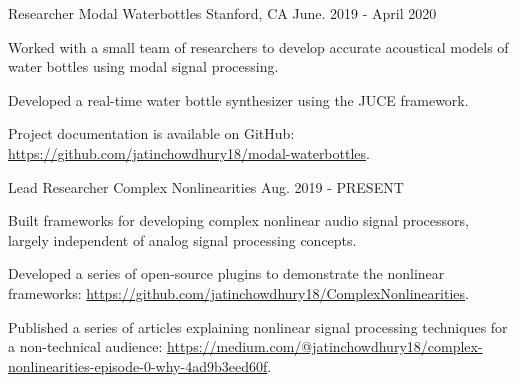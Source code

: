 
\begin{cventries}

    \cventry
    {Researcher} %
    {Modal Waterbottles} %
    {Stanford, CA} %
    {June. 2019 - April 2020} %
    {
      \begin{cvitems} %
        \item {Worked with a small team of researchers to develop accurate acoustical
               models of water bottles using modal signal processing.}
        \item {Developed a real-time water bottle synthesizer using the JUCE framework.}
        \item {Project documentation is available on GitHub: \url{https://github.com/jatinchowdhury18/modal-waterbottles}.}
      \end{cvitems}
    }

    \cventry
    {Lead Researcher} %
    {Complex Nonlinearities} %
    {} %
    {Aug. 2019 - PRESENT} %
    {
      \begin{cvitems} %
        \item {Built frameworks for developing complex nonlinear audio signal
               processors, largely independent of analog signal processing concepts.}
        \item {Developed a series of open-source plugins to demonstrate the nonlinear frameworks:
              \url{https://github.com/jatinchowdhury18/ComplexNonlinearities}.}
        \item {Published a series of articles explaining nonlinear signal
               processing techniques for a non-technical audience:
               \url{https://medium.com/@jatinchowdhury18/complex-nonlinearities-episode-0-why-4ad9b3eed60f}.}
      \end{cvitems}
    }


\end{cventries}

